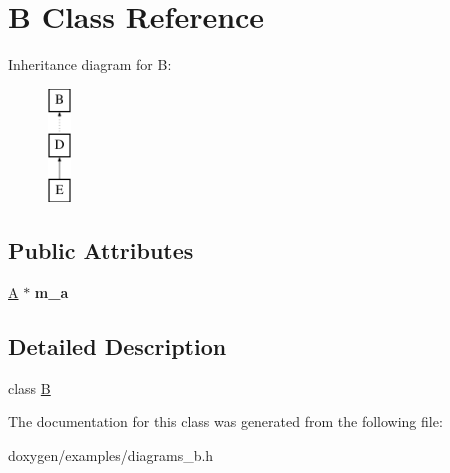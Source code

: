 \hypertarget{class_b}{}\section{B Class Reference}
\label{class_b}
Inheritance diagram for B\+:\begin{figure}[H]
\begin{center}
\leavevmode
\includegraphics[height=3.000000cm]{class_b}
\end{center}
\end{figure}
\subsection*{Public Attributes}
\begin{DoxyCompactItemize}
\item 
\mbox{\label{class_b_a26c70b64fe7cf17fcced7755ecff7537}} 
\mbox{\hyperlink{class_a}{A}} $\ast$ {\bfseries m\+\_\+a}
\end{DoxyCompactItemize}


\subsection{Detailed Description}
class \mbox{\hyperlink{class_b}{B}} 

The documentation for this class was generated from the following file\+:\begin{DoxyCompactItemize}
\item 
doxygen/examples/diagrams\+\_\+b.\+h\end{DoxyCompactItemize}

